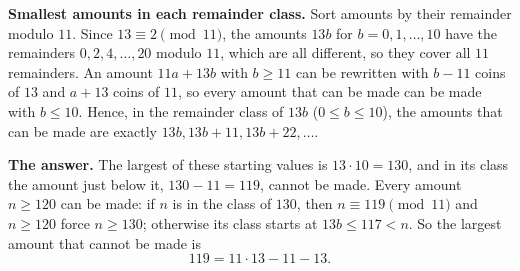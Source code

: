 \textbf{Smallest amounts in each remainder class.} Sort amounts by their remainder modulo $11$. Since $13\equiv2\pmod{11}$, the amounts $13b$ for $b=0,1,\dots,10$ have the remainders $0,2,4,\dots,20$ modulo $11$, which are all different, so they cover all $11$ remainders. An amount $11a+13b$ with $b\ge11$ can be rewritten with $b-11$ coins of $13$ and $a+13$ coins of $11$, so every amount that can be made can be made with $b\le10$. Hence, in the remainder class of $13b$ ($0\le b\le10$), the amounts that can be made are exactly $13b,13b+11,13b+22,\dots$.

\textbf{The answer.} The largest of these starting values is $13\cdot10=130$, and in its class the amount just below it, $130-11=119$, cannot be made. Every amount $n\ge120$ can be made: if $n$ is in the class of $130$, then $n\equiv119\pmod{11}$ and $n\ge120$ force $n\ge130$; otherwise its class starts at $13b\le117<n$. So the largest amount that cannot be made is
\[\boxed{119}=11\cdot13-11-13 .\]
